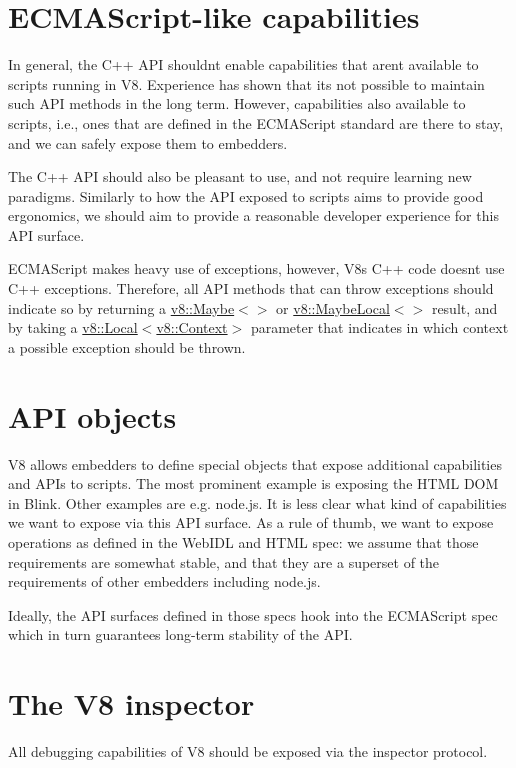 \section*{E\+C\+M\+A\+Script-\/like capabilities}

In general, the C++ A\+PI shouldn\textquotesingle{}t enable capabilities that aren\textquotesingle{}t available to scripts running in V8. Experience has shown that it\textquotesingle{}s not possible to maintain such A\+PI methods in the long term. However, capabilities also available to scripts, i.\+e., ones that are defined in the E\+C\+M\+A\+Script standard are there to stay, and we can safely expose them to embedders.

The C++ A\+PI should also be pleasant to use, and not require learning new paradigms. Similarly to how the A\+PI exposed to scripts aims to provide good ergonomics, we should aim to provide a reasonable developer experience for this A\+PI surface.

E\+C\+M\+A\+Script makes heavy use of exceptions, however, V8\textquotesingle{}s C++ code doesn\textquotesingle{}t use C++ exceptions. Therefore, all A\+PI methods that can throw exceptions should indicate so by returning a \mbox{\hyperlink{classv8_1_1Maybe}{v8\+::\+Maybe}}$<$$>$ or \mbox{\hyperlink{classv8_1_1MaybeLocal}{v8\+::\+Maybe\+Local}}$<$$>$ result, and by taking a \mbox{\hyperlink{classv8_1_1Local}{v8\+::\+Local}}$<$\mbox{\hyperlink{classv8_1_1Context}{v8\+::\+Context}}$>$ parameter that indicates in which context a possible exception should be thrown.

\section*{A\+PI objects}

V8 allows embedders to define special objects that expose additional capabilities and A\+P\+Is to scripts. The most prominent example is exposing the H\+T\+ML D\+OM in Blink. Other examples are e.\+g. node.\+js. It is less clear what kind of capabilities we want to expose via this A\+PI surface. As a rule of thumb, we want to expose operations as defined in the Web\+I\+DL and H\+T\+ML spec\+: we assume that those requirements are somewhat stable, and that they are a superset of the requirements of other embedders including node.\+js.

Ideally, the A\+PI surfaces defined in those specs hook into the E\+C\+M\+A\+Script spec which in turn guarantees long-\/term stability of the A\+PI.

\section*{The V8 inspector}

All debugging capabilities of V8 should be exposed via the inspector protocol. 